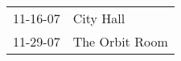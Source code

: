 \begin{supertabular}{p{0.07\textwidth}p{0.23\textwidth}}
 11-16-07 &       City Hall \\
 11-29-07 &  The Orbit Room \\
\end{supertabular}
